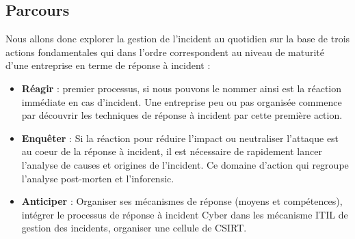 \subsection{Parcours}


Nous allons donc explorer la  gestion de l'incident au quotidien sur la base de trois actions fondamentales qui dans l'ordre correspondent au niveau de maturité d'une entreprise en terme de réponse à incident :


\begin{itemize}
  \item \textbf{Réagir} : premier processus, si nous pouvons le nommer ainsi est  la réaction immédiate en cas d'incident. Une entreprise peu ou pas organisée commence par découvrir les techniques de réponse à incident par cette première action. 

  \item \textbf{Enquêter} : Si la réaction pour réduire l'impact ou neutraliser l'attaque est au coeur de la réponse à incident, il est nécessaire de rapidement lancer l'analyse de causes et origines de l'incident. Ce domaine d'action qui regroupe l'analyse post-morten et l'inforensic.

  \item \textbf{Anticiper} : Organiser ses mécanismes de réponse (moyens et compétences), intégrer le processus de réponse à incident Cyber dans les mécanisme ITIL de gestion des incidents, organiser une cellule de CSIRT.

\end{itemize}








